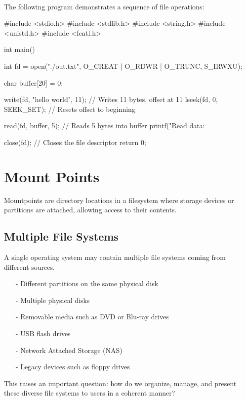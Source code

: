 \newpage
\begin{example}
  \leavevmode \\[5px]
\upshape
The following program demonstrates a sequence of file operations:
\begin{cc}
#include <stdio.h>
#include <stdlib.h>
#include <string.h>
#include <unistd.h>
#include <fcntl.h>

int main() {
    int fd = open("./out.txt", O_CREAT | O_RDWR | O_TRUNC, S_IRWXU);

    char buffer[20] = {0};

    write(fd, "hello world", 11);      // Writes 11 bytes, offset at 11
    lseek(fd, 0, SEEK_SET);            // Resets offset to beginning

    read(fd, buffer, 5);               // Reads 5 bytes into buffer
    printf("Read data: %

    close(fd);                         // Closes the file descriptor
    return 0;
}
\end{cc}
\end{example}

\section{Mount Points}
Mountpoints are directory locations in a filesystem where storage devices or partitions are attached, allowing access to their contents.
\subsection{Multiple File Systems}
A single operating system may contain multiple file systems coming from different sources.\\
\begin{itemize}[itemsep=2pt, topsep=1pt]
    \item[-]Different partitions on the same physical disk
    \item[-]Multiple physical disks
    \item[-]Removable media such as DVD or Blu-ray drives
    \item[-]USB flash drives
    \item[-]Network Attached Storage (NAS)
    \item[-]Legacy devices such as floppy drives
\end{itemize}

This raises an important question: how do we organize, manage, and present these diverse file systems to users in a coherent manner?

